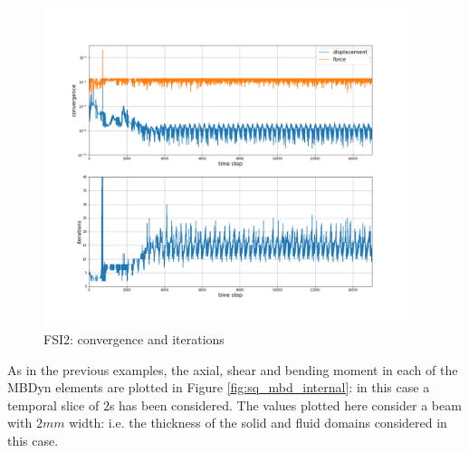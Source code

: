\begin{figure}[htbp!]
	\centering
	\includegraphics[width=0.95\textwidth, trim=0 80 0 100, clip]{images/FSI2/MBD_iterations_fsi2.png}
	\caption{FSI2: convergence and iterations}
	\label{fig:FSI2_mbd_iter}
\end{figure}

As in the previous examples, the axial, shear and bending moment in each of the MBDyn elements are plotted in Figure \ref{fig:sq_mbd_internal}: in this case a temporal slice of $2$\si{s} has been considered. The values plotted here consider a beam with $2mm$ width: i.e. the thickness of the solid and fluid domains considered in this case.

